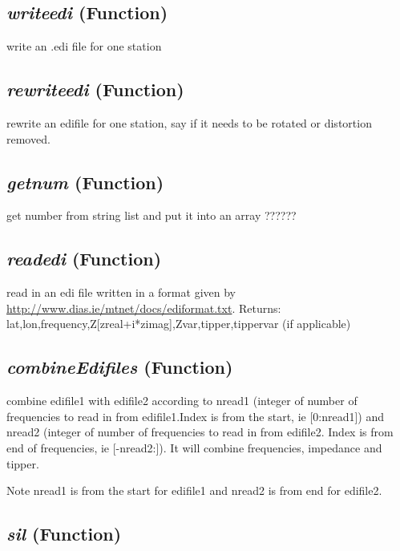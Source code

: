 \subsection{\textit{writeedi} (Function)}
\label{ssec:core.mttools.writeedi}

write an .edi file for one station

\subsection{\textit{rewriteedi} (Function)}
\label{ssec:core.mttools.rewriteedi}

rewrite an edifile for one station, say if it needs to be rotated 
    or distortion removed.

\subsection{\textit{getnum} (Function)}
\label{ssec:core.mttools.getnum}

get number from string list and put it into an array ??????

\subsection{\textit{readedi} (Function)}
\label{ssec:core.mttools.readedi}

read in an edi file written in a format given by
    \url{http://www.dias.ie/mtnet/docs/ediformat.txt}.
    Returns: lat,lon,frequency,Z[zreal+i*zimag],Zvar,tipper,tippervar (if 
    applicable)

\subsection{\textit{combineEdifiles} (Function)}
\label{ssec:core.mttools.combineEdifiles}

combine edifile1 with
    edifile2 according to nread1 (integer of number of frequencies to read in from edifile1.Index is from the start, ie [0:nread1]) and nread2 (integer of number of frequencies to read in from edifile2. Index is from end of frequencies, ie [-nread2:]). It will combine frequencies, impedance and tipper.
    
    Note nread1 is from the start for edifile1 and nread2 is from end for 
    edifile2.

\subsection{\textit{sil} (Function)}
\label{ssec:core.mttools.sil}


